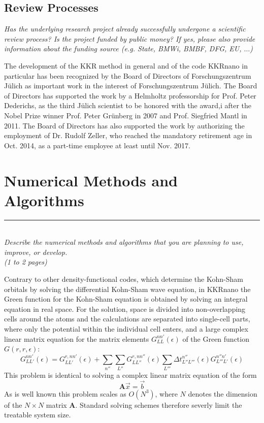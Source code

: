 \documentclass [a4paper, 12pt]{article}
\newcommand{\matr}[1]{\bm{#1}}
\begin{document}
\subsection{Review Processes}
\textit{Has the underlying research project already successfully undergone a scientific review process? Is the project funded by public money?
If yes, please also provide information about the funding source
(e.g. State, BMWi, BMBF, DFG, EU, $\dots$)}

The development of the KKR method in general and of the code KKRnano in particular has been recognized 
by the Board of Directors of Forschungszentrum J{\"u}lich as important work in the interest of 
Forschungszentrum J{\"u}lich. The Board of Directors has supported the work by a Helmholtz professorship 
for Prof. Peter Dederichs, as the third Jülich scientist to be honored with the award,i
after the Nobel Prize winner Prof. Peter Grünberg in 2007 and Prof. Siegfried Mantl in 2011. 
The Board of Directors has also supported the work by authorizing the employment of Dr. Rudolf Zeller, 
who reached the mandatory retirement age in Oct. 2014, as a part-time employee at least until Nov. 2017. 


\section{Numerical Methods and Algorithms} 
\rule{\textwidth}{0.4pt}\\
\textit{Describe the numerical methods and algorithms that you are planning to use, improve, or develop.}\\
 
\textit{(1 to 2 pages)}
\bigskip

Contrary to other density-functional codes, which determine the Kohn-Sham orbitals by solving
the differential Kohn-Sham wave equation, in KKRnano the Green function for the Kohn-Sham
equation is obtained by solving an integral equation in real space. For the solution, space is divided
into non-overlapping cells around the atoms and the calculations are separated into single-cell parts,
where only the potential within the individual cell enters, and a large complex linear matrix equation for 
the matrix elements $G_{LL}^{nn'} (\epsilon)$ of the Green function $G(r, r , \epsilon)$:
\begin{equation}
	G_{LL'}^{nn'} (\epsilon) = G_{LL'}^{r,nn'} (\epsilon) + \sum_{n''} \sum_{L''}
	G_{LL''}^{r,nn''} (\epsilon) \sum_{L'''} \Delta t_{L'' L'''}^{n''} (\epsilon)
	G_{L'''L'}^{n''n'} (\epsilon)
	\label{eq:dyson_eq}
\end{equation}
This problem is identical to solving a complex linear matrix equation of the form
\begin{equation}
	\matr{A} \vec{x} = \vec{b}
\end{equation}
As is well known this problem scales as $O(N^3)$, where $N$ denotes the dimension of the $N \times N$
matrix $\matr{A}$. Standard solving schemes therefore severly limit the treatable system size.
\end{document}
